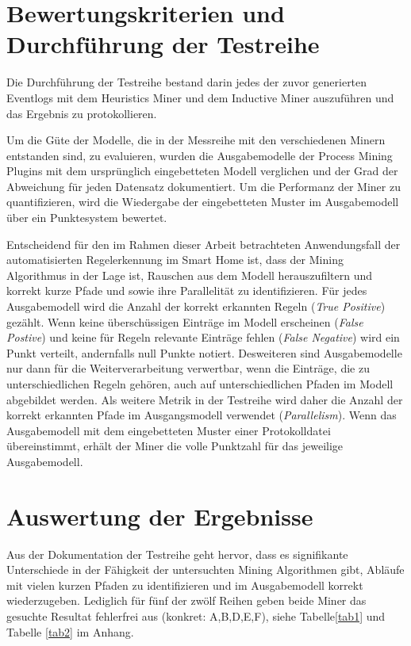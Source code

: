 \section{Bewertungskriterien und Durchführung der Testreihe}\label{sec:tests}
Die Durchführung der Testreihe bestand darin jedes der zuvor generierten Eventlogs mit dem Heuristics Miner und dem Inductive Miner auszuführen und das Ergebnis zu protokollieren. 

Um die Güte der Modelle, die in der Messreihe mit den verschiedenen Minern entstanden sind, zu evaluieren, wurden die Ausgabemodelle der Process Mining Plugins mit dem ursprünglich eingebetteten Modell verglichen und der Grad der Abweichung für jeden Datensatz dokumentiert. Um die Performanz der Miner zu quantifizieren, wird die Wiedergabe der eingebetteten Muster im Ausgabemodell über ein Punktesystem bewertet. 

Entscheidend für den im Rahmen dieser Arbeit betrachteten Anwendungsfall der automatisierten Regelerkennung im Smart Home ist, dass der Mining Algorithmus in der Lage ist, Rauschen aus dem Modell herauszufiltern und korrekt kurze Pfade und sowie ihre Parallelität zu identifizieren. Für jedes Ausgabemodell wird die Anzahl der korrekt erkannten Regeln (\textit{True Positive}) gezählt. Wenn keine überschüssigen Einträge im Modell erscheinen  (\textit{False Postive}) und keine für Regeln relevante Einträge fehlen (\textit{False Negative}) wird ein Punkt verteilt, andernfalls null Punkte notiert. 
Desweiteren sind Ausgabemodelle nur dann für die Weiterverarbeitung verwertbar, wenn die Einträge, die zu unterschiedlichen Regeln gehören, auch auf unterschiedlichen Pfaden im Modell abgebildet werden. Als weitere Metrik in der Testreihe wird daher die Anzahl der korrekt erkannten Pfade im Ausgangsmodell verwendet (\textit{Parallelism}). Wenn das Ausgabemodell mit dem eingebetteten Muster einer Protokolldatei übereinstimmt, erhält der Miner die volle Punktzahl für das jeweilige Ausgabemodell. 

\section{Auswertung der Ergebnisse}\label{sec:res}
Aus der Dokumentation der Testreihe geht hervor, dass es signifikante Unterschiede in der Fähigkeit der untersuchten Mining Algorithmen gibt, Abläufe mit vielen kurzen Pfaden zu identifizieren und im Ausgabemodell korrekt wiederzugeben. Lediglich für fünf der zwölf Reihen geben beide Miner das gesuchte Resultat fehlerfrei aus (konkret: A,B,D,E,F), siehe Tabelle\ref{tab1} und Tabelle \ref{tab2} im Anhang. 

